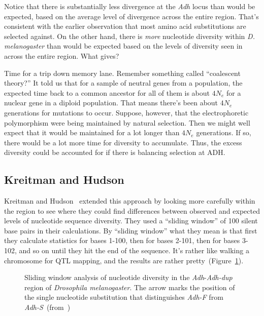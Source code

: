 \documentclass[12pt]{article}
\begin{document}
Notice that there is substantially less divergence at the {\it Adh\/}
locus than would be expected, based on the average level of divergence
across the entire region. That's consistent with the earlier
observation that most amino acid substitutions are selected
against. On the other hand, there is {\it more\/} nucleotide diversity
within {\it D. melanogaster\/} than would be expected based on the
levels of diversity seen in across the entire region. What gives?

Time for a trip down memory lane. Remember something called
``coalescent theory?'' It told us that for a sample of neutral genes
from a population, the expected time back to a common ancestor for all
of them is about $4N_e$ for a nuclear gene in a diploid
population. That means there's been about $4N_e$ generations for
mutations to occur. Suppose, however, that the electrophoretic
polymorphism were being maintained by natural selection. Then we might
well expect that it would be maintained for a lot longer than $4N_e$
generations. If so, there would be a lot more time for diversity to
accumulate. Thus, the excess diversity could be accounted for if there
is balancing selection at ADH.

\subsection*{Kreitman and Hudson}

Kreitman and Hudson~\cite{Kreitman-Hudson91} extended this approach by
looking more carefully within the region to see where they could find
differences between observed and expected levels of nucleotide
sequence diversity. They used a ``sliding window'' of 100 silent base
pairs in their calculations. By ``sliding window'' what they mean is
that first they calculate statistics for bases 1-100, then for bases
2-101, then for bases 3-102, and so on until they hit the end of the
sequence. It's rather like walking a chromosome for QTL mapping, and
the results are rather pretty~(Figure~\ref{fig:kh}). 

\begin{figure}
\begin{center}
\end{center}
\caption{Sliding window analysis of nucleotide diversity in the {\it
    Adh\/}-{\it Adh-dup} region of {\it Drosophila melanogaster}. The
  arrow marks the position of the single nucleotide substitution that
  distinguishes {\it Adh-F\/} from {\it
    Adh-S\/}~(from~\cite{Kreitman-Hudson91})}\label{fig:kh}
\end{figure}
\end{document}
